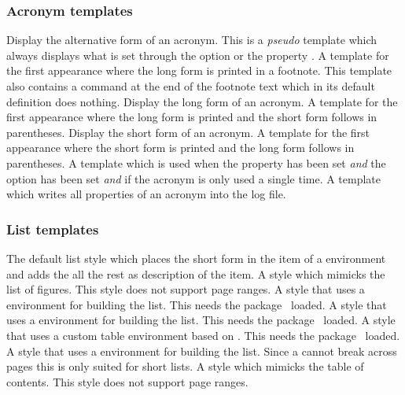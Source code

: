 \documentclass{acro-manual}
\begin{document}
\subsubsection{Acronym templates}
\begin{templates}
    Display the alternative form of an acronym.
    This is a \emph{pseudo} template which always displays what is
    set through the option  or the property
    .
    A template for the first appearance where the long form is printed in a
    footnote.  This template also contains a command
     at the end of the footnote text
    which in its default definition does nothing.
    Display the long form of an acronym.
    A template for the first appearance where the long form is printed and the
    short form follows in parentheses.
    Display the short form of an acronym.
    A template for the first appearance where the short form is printed and the
    long form follows in parentheses.
    A template which is used when the property  has been set
    \emph{and} the option  has been set \emph{and} if the
    acronym is only used a single time.
    A template which writes all properties of an acronym into the log file.
\end{templates}

\subsubsection{List templates}
\begin{templates}
    The default list style which places the short form in the item of a
     environment and adds the all the rest as description of
    the item.
    A style which mimicks the list of figures.  This style does not support
    page ranges.
    A style that uses a  environment for building the list.
    This needs the  package~\cite{pkg:longtable} loaded.
    A style that uses a  environment for
    building the list.  This needs the 
    package~\cite{pkg:supertabular} loaded.
    A style that uses a custom table environment
     based on . This needs the 
    package~\cite{pkg:tabularray} loaded.
    A style that uses a  environment for building the list.
    Since a  cannot break across pages this is only suited for
    short lists.
    A style which mimicks the table of contents.  This style does not support
    page ranges.
\end{templates}
\end{document}
